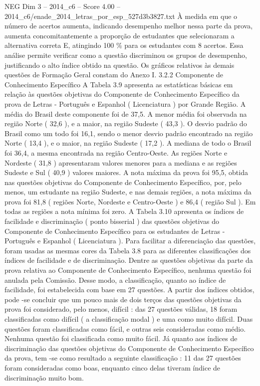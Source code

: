 \begin{textsample}{NEG Dim 3 – 2014\_c6 – Score 4.00 – 2014\_c6/enade\_2014\_letras\_por\_esp\_527d3b3827.txt}
À medida em que o número de acertos aumenta, indicando desempenho melhor nessa parte da prova, aumenta concomitantemente a proporção de estudantes que selecionaram a alternativa correta E, atingindo 100 \% para os estudantes com 8 acertos.
Essa análise permite verificar como a questão discriminou os grupos de desempenho, justificando o alto índice obtido na questão.
Os gráficos relativos às demais questões de Formação Geral constam do Anexo I. 3.2.2 Componente de Conhecimento Específico A Tabela 3.9 apresenta as estatísticas básicas em relação às questões objetivas do Componente de Conhecimento Específico da prova de Letras - Português e Espanhol ( Licenciatura ) por Grande Região.
A média do Brasil deste componente foi de 37,5.
A menor média foi observada na região Norte ( 32,6 ), e a maior, na região Sudeste ( 43,3 ).
O desvio padrão do Brasil como um todo foi 16,1, sendo o menor desvio padrão encontrado na região Norte ( 13,4 ), e o maior, na região Sudeste ( 17,2 ).
A mediana de todo o Brasil foi 36,4, a mesma encontrada na região Centro-Oeste.
As regiões Norte e Nordeste ( 31,8 ) apresentaram valores menores para a mediana e as regiões Sudeste e Sul ( 40,9 ) valores maiores.
A nota máxima da prova foi 95,5, obtida nas questões objetivas do Componente de Conhecimento Específico, por, pelo menos, um estudante na região Sudeste, e nas demais regiões, a nota máxima da prova foi 81,8 ( regiões Norte, Nordeste e Centro-Oeste ) e 86,4 ( região Sul ).
Em todas as regiões a nota mínima foi zero.
A Tabela 3.10 apresenta os índices de facilidade e discriminação ( ponto bisserial ) das questões objetivas do Componente de Conhecimento Específico para os estudantes de Letras - Português e Espanhol ( Licenciatura ).
Para facilitar a diferenciação das questões, foram usadas as mesmas cores da Tabela 3.8 para as diferentes classificações dos índices de facilidade e de discriminação.
Dentre as questões objetivas da parte da prova relativa ao Componente de Conhecimento Específico, nenhuma questão foi anulada pela Comissão.
Desse modo, a classificação, quanto ao índice de facilidade, foi estabelecida com base em 27 questões.
A partir dos índices obtidos, pode -se concluir que um pouco mais de dois terços das questões objetivas da prova foi considerado, pelo menos, difícil : das 27 questões válidas, 18 foram classificadas como difícil ( a classificação modal ) e uma como muito difícil.
Duas questões foram classificadas como fácil, e outras seis consideradas como médio.
Nenhuma questão foi classificada como muito fácil.
Já quanto aos índices de discriminação das questões objetivas do Componente de Conhecimento Específico da prova, tem -se como resultado a seguinte classificação : 11 das 27 questões foram consideradas como boas, enquanto cinco delas tiveram índice de discriminação muito bom.

\end{textsample}
